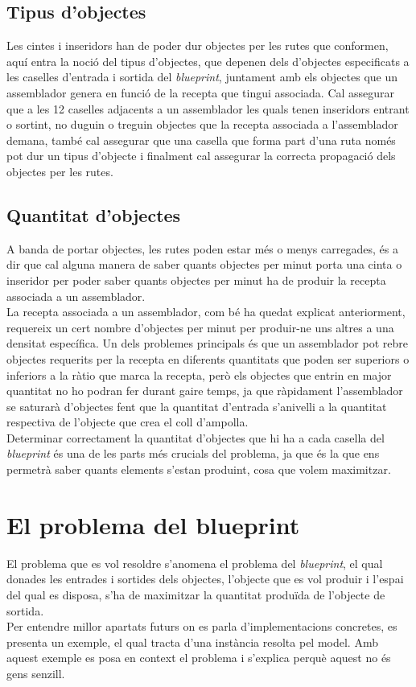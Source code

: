 \subsection{Tipus d'objectes}
Les cintes i inseridors han de poder dur objectes per les rutes que conformen, aquí entra la noció del tipus d'objectes, que depenen dels d'objectes especificats a les caselles d'entrada i sortida del \textit{blueprint}, juntament amb els objectes que un assemblador genera en funció de la recepta que tingui associada. Cal assegurar que a les 12 caselles adjacents a un assemblador les quals tenen inseridors entrant o sortint, no duguin o treguin objectes que la recepta associada a l'assemblador demana, també cal assegurar que una casella que forma part d'una ruta només pot dur un tipus d'objecte i finalment cal assegurar la correcta propagació dels objectes per les rutes.

\subsection{Quantitat d'objectes}
A banda de portar objectes, les rutes poden estar més o menys carregades, és a dir que cal alguna manera de saber quants objectes per minut porta una cinta o inseridor per poder saber quants objectes per minut ha de produir la recepta associada a un assemblador.\\
La recepta associada a un assemblador, com bé ha quedat explicat anteriorment, requereix un cert nombre d'objectes per minut per produir-ne uns altres a una densitat específica. Un dels problemes principals és que un assemblador pot rebre objectes requerits per la recepta en diferents quantitats que poden ser superiors o inferiors a la ràtio que marca la recepta, però els objectes que entrin en major quantitat no ho podran fer durant gaire temps, ja que ràpidament l'assemblador se saturarà d'objectes fent que la quantitat d'entrada s'anivelli a la quantitat respectiva de l'objecte que crea el coll d'ampolla.\\
Determinar correctament la quantitat d'objectes que hi ha a cada casella del \textit{blueprint} és una de les parts més crucials del problema, ja que és la que ens permetrà saber quants elements s'estan produint, cosa que volem maximitzar.

\section{El problema del blueprint} \label{sec:blueprint_problem}
El problema que es vol resoldre s'anomena el problema del \textit{blueprint}, el qual donades les entrades i sortides dels objectes, l'objecte que es vol produir i l'espai del qual es disposa, s'ha de maximitzar la quantitat produïda de l'objecte de sortida.\\
Per entendre millor apartats futurs on es parla d'implementacions concretes, es presenta un exemple, el qual tracta d'una instància resolta pel model. Amb aquest exemple es posa en context el problema i s'explica perquè aquest no és gens senzill.

